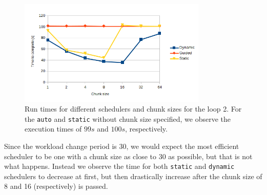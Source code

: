 \documentclass[11pt,a4paper]{article}
\begin{document}
\begin{figure}[h!]
    \begin{center}
        \includegraphics[width=0.8\textwidth]{loop2.png}
    \end{center}
    \caption{Run times for different schedulers and chunk sizes for the loop 2. For the \texttt{auto} and \texttt{static} without chunk size specified, we observe the execution times of \(99s\) and \(100s\), respectively.}
\end{figure}

Since the workload change period is 30, we would expect the most efficient scheduler to be one with a chunk size as close to 30 as possible, but that is not what happens. Instead we observe the time for both \texttt{static} and \texttt{dynamic} schedulers to decrease at first, but then drastically increase after the chunk size of 8 and 16 (respectively) is passed. 
\end{document}
